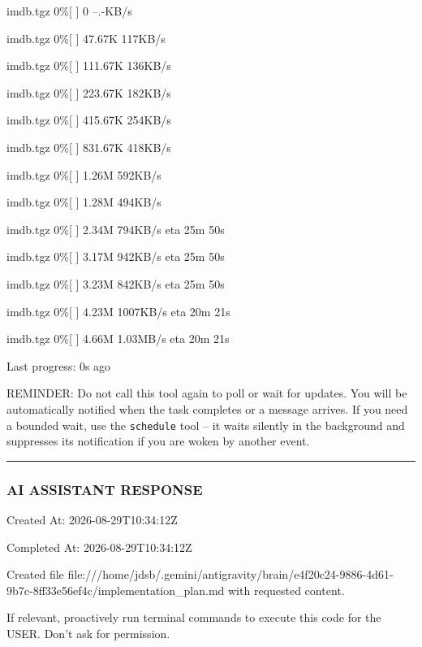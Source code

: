 \documentclass[11pt,a4paper]{article}
\begin{document}
imdb.tgz              0\%[                    ]       0  --.-KB/s

imdb.tgz              0\%[                    ]  47.67K   117KB/s

imdb.tgz              0\%[                    ] 111.67K   136KB/s

imdb.tgz              0\%[                    ] 223.67K   182KB/s

imdb.tgz              0\%[                    ] 415.67K   254KB/s

imdb.tgz              0\%[                    ] 831.67K   418KB/s

imdb.tgz              0\%[                    ]   1.26M   592KB/s

imdb.tgz              0\%[                    ]   1.28M   494KB/s

imdb.tgz              0\%[                    ]   2.34M   794KB/s    eta 25m 50s

imdb.tgz              0\%[                    ]   3.17M   942KB/s    eta 25m 50s

imdb.tgz              0\%[                    ]   3.23M   842KB/s    eta 25m 50s

imdb.tgz              0\%[                    ]   4.23M  1007KB/s    eta 20m 21s

imdb.tgz              0\%[                    ]   4.66M  1.03MB/s    eta 20m 21s


Last progress: 0s ago



REMINDER: Do not call this tool again to poll or wait for updates. You will be automatically notified when the task completes or a message arrives. If you need a bounded wait, use the \texttt{schedule} tool -- it waits silently in the background and suppresses its notification if you are woken by another event.


\hrule

\subsubsection{AI ASSISTANT RESPONSE}

Created At: 2026-08-29T10:34:12Z

Completed At: 2026-08-29T10:34:12Z

Created file file:///home/jdsb/.gemini/antigravity/brain/e4f20c24-9886-4d61-9b7c-8ff33e56ef4c/implementation\_plan.md with requested content.

If relevant, proactively run terminal commands to execute this code for the USER. Don't ask for permission.
\end{document}
